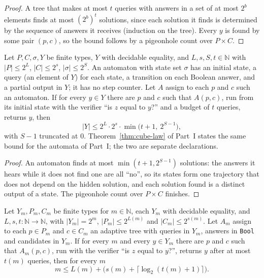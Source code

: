 \begin{proof}
  \leanok
  A tree that makes at most $t$ queries with answers in a set of at most $2^b$ elements finds at
  most $(2^b)^t$ solutions, since each solution it finds is determined by the sequence of answers it
  receives (induction on the tree). Every $y$ is found by some pair $(p, c)$, so the bound follows by
  a pigeonhole count over $P \times C$.
\end{proof}

\begin{theorem}
  \label{thm:arrow-cube}
  \leanok
  Let $P, C, \sigma, Y$ be finite types, $Y$ with decidable equality, and $L, s, S, t \in
  \mathbb{N}$ with $|P| \le 2^L$, $|C| \le 2^s$, $|\sigma| \le 2^S$. An automaton with state set
  $\sigma$ has an initial state, a query (an element of $Y$) for each state, a transition on each
  Boolean answer, and a partial output in $Y$; it has no step counter. Let $A$ assign to each $p$ and
  $c$ such an automaton. If for every $y \in Y$ there are $p$ and $c$ such that $A(p, c)$, run from
  its initial state with the verifier ``is $z$ equal to $y$?'' and a budget of $t$ queries, returns
  $y$, then
  \[
    |Y| \le 2^L \cdot 2^s \cdot \min\bigl(t + 1,\ 2^{S-1}\bigr),
  \]
  with $S - 1$ truncated at $0$. Theorem~\ref{thm:cube-law} of Part~I states the same bound for the
  automata of Part~I; the two are separate declarations.
  \own{}
\end{theorem}

\begin{proof}
  \leanok
  An automaton finds at most $\min(t + 1, 2^{S-1})$ solutions: the answers it hears while it does not
  find one are all ``no'', so its states form one trajectory that does not depend on the hidden
  solution, and each solution found is a distinct output of a state. The pigeonhole count over
  $P \times C$ finishes.
\end{proof}

\begin{theorem}
  \label{thm:arrow-price-paid}
  \leanok
  Let $Y_m, P_m, C_m$ be finite types for $m \in \mathbb{N}$, each $Y_m$ with decidable equality, and
  $L, s, t : \mathbb{N} \to \mathbb{N}$, with $|Y_m| = 2^m$, $|P_m| \le 2^{L(m)}$ and $|C_m| \le
  2^{s(m)}$. Let $A_m$ assign to each $p \in P_m$ and $c \in C_m$ an adaptive tree with queries in
  $Y_m$, answers in \texttt{Bool} and candidates in $Y_m$. If for every $m$ and every $y \in Y_m$ there
  are $p$ and $c$ such that $A_m(p, c)$, run with the verifier ``is $z$ equal to $y$?'', returns $y$
  after at most $t(m)$ queries, then for every $m$
  \[
    m \le L(m) + \bigl(s(m) + \lceil \log_2 (t(m) + 1) \rceil\bigr).
  \]
  \own{}
\end{theorem}

